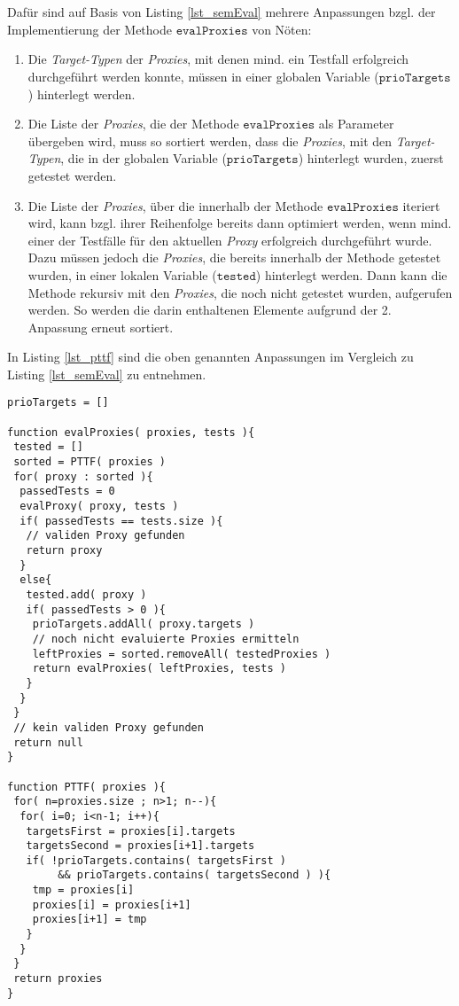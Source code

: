 \\\\
Dafür sind auf Basis von Listing \ref{lst_semEval} mehrere Anpassungen bzgl. der Implementierung der Methode $\texttt{evalProxies}$ von Nöten:
\begin{enumerate}
\item 
Die \emph{Target-Typen} der \emph{Proxies}, mit denen mind. ein Testfall erfolgreich durchgeführt werden konnte, müssen in einer globalen Variable ($\texttt{prioTargets}$) hinterlegt werden.

\item 
Die Liste der \emph{Proxies}, die der Methode $\texttt{evalProxies}$ als Parameter übergeben wird, muss so sortiert werden, dass die \emph{Proxies}, mit den \emph{Target-Typen}, die in der globalen Variable ($\texttt{prioTargets}$) hinterlegt wurden, zuerst getestet werden. 

\item 
Die Liste der \emph{Proxies}, über die innerhalb der Methode $\texttt{evalProxies}$ iteriert wird, kann bzgl. ihrer Reihenfolge bereits dann optimiert werden, wenn mind. einer der Testfälle für den aktuellen \emph{Proxy} erfolgreich durchgeführt wurde. Dazu müssen jedoch die \emph{Proxies}, die bereits innerhalb der Methode getestet wurden, in einer lokalen Variable ($\texttt{tested}$) hinterlegt werden. Dann kann die Methode rekursiv mit den \emph{Proxies}, die noch nicht getestet wurden, aufgerufen werden. So werden die darin enthaltenen Elemente aufgrund der 2. Anpassung erneut sortiert.
\end{enumerate}  
In Listing \ref{lst_pttf} sind die oben genannten Anpassungen im Vergleich zu Listing \ref{lst_semEval} zu entnehmen. 
\begin{lstlisting}[style = pseudo, caption = Semantische Evaluation mit Heuristik PTTF, captionpos = b, label = lst_pttf]
prioTargets = []

function evalProxies( proxies, tests ){
 tested = []
 sorted = PTTF( proxies )
 for( proxy : sorted ){
  passedTests = 0
  evalProxy( proxy, tests )
  if( passedTests == tests.size ){
   // validen Proxy gefunden
   return proxy
  }
  else{
   tested.add( proxy )
   if( passedTests > 0 ){
    prioTargets.addAll( proxy.targets )
    // noch nicht evaluierte Proxies ermitteln
    leftProxies = sorted.removeAll( testedProxies )
    return evalProxies( leftProxies, tests )
   }
  }
 }
 // kein validen Proxy gefunden
 return null
}

function PTTF( proxies ){
 for( n=proxies.size ; n>1; n--){
  for( i=0; i<n-1; i++){
   targetsFirst = proxies[i].targets
   targetsSecond = proxies[i+1].targets			
   if( !prioTargets.contains( targetsFirst ) 
        && prioTargets.contains( targetsSecond ) ){
    tmp = proxies[i]
    proxies[i] = proxies[i+1]
    proxies[i+1] = tmp
   }
  }
 }
 return proxies	
}
\end{lstlisting}

